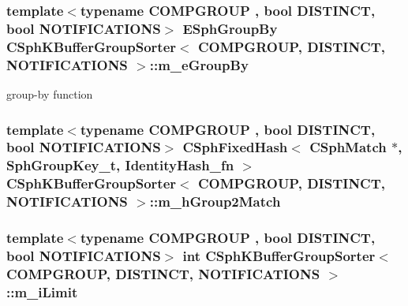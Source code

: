 \hypertarget{classCSphKBufferGroupSorter_a6dbd942bde1f49a261614c331e347afe}{
\subsubsection[{m\-\_\-e\-Group\-By}]{\setlength{\rightskip}{0pt plus 5cm}template$<$typename C\-O\-M\-P\-G\-R\-O\-U\-P , bool D\-I\-S\-T\-I\-N\-C\-T, bool N\-O\-T\-I\-F\-I\-C\-A\-T\-I\-O\-N\-S$>$ {\bf E\-Sph\-Group\-By} {\bf C\-Sph\-K\-Buffer\-Group\-Sorter}$<$ C\-O\-M\-P\-G\-R\-O\-U\-P, D\-I\-S\-T\-I\-N\-C\-T, N\-O\-T\-I\-F\-I\-C\-A\-T\-I\-O\-N\-S $>$\-::m\-\_\-e\-Group\-By\hspace{0.3cm}{\ttfamily [protected]}}}\label{classCSphKBufferGroupSorter_a6dbd942bde1f49a261614c331e347afe}


group-\/by function 

\hypertarget{classCSphKBufferGroupSorter_a1d4e4788ed911ba7669d06726aae212a}{
\subsubsection[{m\-\_\-h\-Group2\-Match}]{\setlength{\rightskip}{0pt plus 5cm}template$<$typename C\-O\-M\-P\-G\-R\-O\-U\-P , bool D\-I\-S\-T\-I\-N\-C\-T, bool N\-O\-T\-I\-F\-I\-C\-A\-T\-I\-O\-N\-S$>$ {\bf C\-Sph\-Fixed\-Hash}$<$ {\bf C\-Sph\-Match} $\ast$, {\bf Sph\-Group\-Key\-\_\-t}, {\bf Identity\-Hash\-\_\-fn} $>$ {\bf C\-Sph\-K\-Buffer\-Group\-Sorter}$<$ C\-O\-M\-P\-G\-R\-O\-U\-P, D\-I\-S\-T\-I\-N\-C\-T, N\-O\-T\-I\-F\-I\-C\-A\-T\-I\-O\-N\-S $>$\-::m\-\_\-h\-Group2\-Match\hspace{0.3cm}{\ttfamily [protected]}}}\label{classCSphKBufferGroupSorter_a1d4e4788ed911ba7669d06726aae212a}
\hypertarget{classCSphKBufferGroupSorter_a05b589f8d2549af833b36c19b99167ea}{
\subsubsection[{m\-\_\-i\-Limit}]{\setlength{\rightskip}{0pt plus 5cm}template$<$typename C\-O\-M\-P\-G\-R\-O\-U\-P , bool D\-I\-S\-T\-I\-N\-C\-T, bool N\-O\-T\-I\-F\-I\-C\-A\-T\-I\-O\-N\-S$>$ {\bf int} {\bf C\-Sph\-K\-Buffer\-Group\-Sorter}$<$ C\-O\-M\-P\-G\-R\-O\-U\-P, D\-I\-S\-T\-I\-N\-C\-T, N\-O\-T\-I\-F\-I\-C\-A\-T\-I\-O\-N\-S $>$\-::m\-\_\-i\-Limit\hspace{0.3cm}{\ttfamily [protected]}}}\label{classCSphKBufferGroupSorter_a05b589f8d2549af833b36c19b99167ea}


